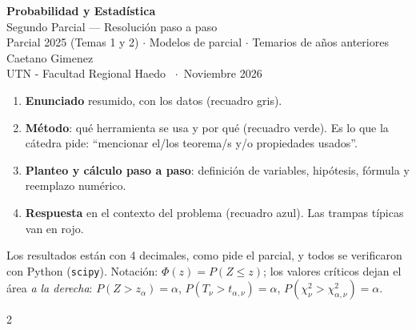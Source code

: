 \documentclass[11pt,a4paper]{article}
\newcommand{\chis}{\chi^2}
\begin{document}
\begin{center}
{\LARGE\bfseries\color{azul} Probabilidad y Estadística}\\[4pt]
{\large Segundo Parcial --- Resolución paso a paso}\\[2pt]
{\normalsize Parcial 2025 (Temas 1 y 2) $\cdot$ Modelos de parcial $\cdot$ Temarios de años anteriores}\\[8pt]
{\normalsize Caetano Gimenez}\\[1pt]
{\small UTN - Facultad Regional Haedo \ $\cdot$\ Noviembre 2026}
\end{center}

\begin{tcolorbox}[colback=white,colframe=azul!60,boxrule=0.5pt,arc=2pt,title={\bfseries Cómo está resuelto cada ejercicio},colbacktitle=azul!80,fonttitle=\small]
\small
\begin{enumerate}[leftmargin=14pt]
\item \textbf{Enunciado} resumido, con los datos (recuadro gris).
\item \textbf{Método}: qué herramienta se usa y por qué (recuadro verde). Es lo que la cátedra pide: ``mencionar el/los teorema/s y/o propiedades usados''.
\item \textbf{Planteo y cálculo paso a paso}: definición de variables, hipótesis, fórmula y reemplazo numérico.
\item \textbf{Respuesta} en el contexto del problema (recuadro azul). Las trampas típicas van en rojo.
\end{enumerate}
Los resultados están con 4 decimales, como pide el parcial, y todos se verificaron con Python (\texttt{scipy}). Notación: $\Phi(z)=P(Z\le z)$; los valores críticos dejan el área \emph{a la derecha}: $P(Z>z_\alpha)=\alpha$, $P(T_\nu>t_{\alpha,\nu})=\alpha$, $P(\chis_\nu>\chis_{\alpha,\nu})=\alpha$.
\end{tcolorbox}

{\small\setcounter{tocdepth}{2}
\begin{multicols}{2}
\tableofcontents
\end{multicols}}




\end{document}
